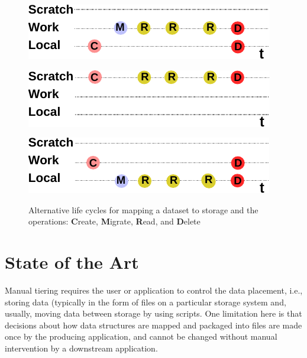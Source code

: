 \documentclass{superfri}
\begin{document}
\begin{figure}[b]
    \begin{minipage}{.33\linewidth}
        \centering
        \includegraphics[width=0.9\columnwidth]{pic/lifecycle-1}
        \label{fig:lifecycle1}
    \end{minipage}
    \begin{minipage}{.33\linewidth}
        \centering
        \includegraphics[width=0.9\columnwidth]{pic/lifecycle-2}
        \label{fig:lifecycle2}
    \end{minipage}
    \begin{minipage}{.33\linewidth}
        \centering
        \includegraphics[width=0.9\columnwidth]{pic/lifecycle-3}
        \label{fig:lifecycle3}
    \end{minipage}
    \vspace{5pt}
    \caption{Alternative life cycles for mapping a dataset to storage and the operations: \textbf{C}reate, \textbf{M}igrate, \textbf{R}ead, and \textbf{D}elete}
    \label{fig:lifecycle}
\end{figure}

\section{State of the Art}

Manual tiering requires the user or application to control the data placement, i.e., storing data (typically in the form of files on a particular storage system and, usually, moving data between storage by using scripts.
One limitation here is that decisions about how data structures are mapped and packaged into files are made once by the producing application, and cannot be changed without manual intervention by a downstream application.
\end{document}
